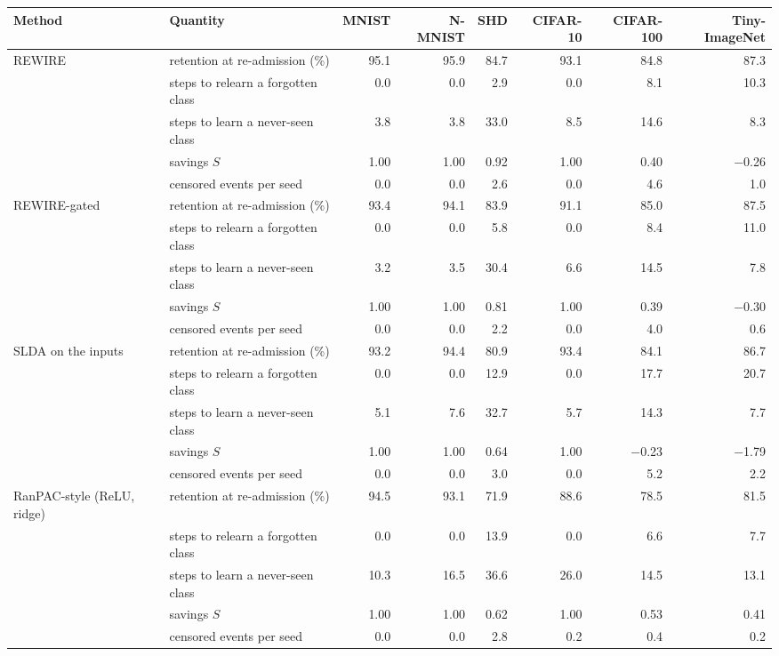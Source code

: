 \begin{tabular*}{\textwidth}{@{\extracolsep{\fill}}lp{3.2cm}rrrrrr@{}}
\toprule
Method & Quantity & MNIST & N-MNIST & SHD & CIFAR-10 & CIFAR-100 & Tiny-ImageNet \\
\midrule
REWIRE & retention at re-admission (\%) & 95.1 & 95.9 & 84.7 & 93.1 & 84.8 & 87.3 \\
 & steps to relearn a forgotten class & 0.0 & 0.0 & 2.9 & 0.0 & 8.1 & 10.3 \\
 & steps to learn a never-seen class & 3.8 & 3.8 & 33.0 & 8.5 & 14.6 & 8.3 \\
 & savings $S$ & 1.00 & 1.00 & 0.92 & 1.00 & 0.40 & \ensuremath{-}0.26 \\
 & censored events per seed & 0.0 & 0.0 & 2.6 & 0.0 & 4.6 & 1.0 \\
REWIRE-gated & retention at re-admission (\%) & 93.4 & 94.1 & 83.9 & 91.1 & 85.0 & 87.5 \\
 & steps to relearn a forgotten class & 0.0 & 0.0 & 5.8 & 0.0 & 8.4 & 11.0 \\
 & steps to learn a never-seen class & 3.2 & 3.5 & 30.4 & 6.6 & 14.5 & 7.8 \\
 & savings $S$ & 1.00 & 1.00 & 0.81 & 1.00 & 0.39 & \ensuremath{-}0.30 \\
 & censored events per seed & 0.0 & 0.0 & 2.2 & 0.0 & 4.0 & 0.6 \\
SLDA on the inputs & retention at re-admission (\%) & 93.2 & 94.4 & 80.9 & 93.4 & 84.1 & 86.7 \\
 & steps to relearn a forgotten class & 0.0 & 0.0 & 12.9 & 0.0 & 17.7 & 20.7 \\
 & steps to learn a never-seen class & 5.1 & 7.6 & 32.7 & 5.7 & 14.3 & 7.7 \\
 & savings $S$ & 1.00 & 1.00 & 0.64 & 1.00 & \ensuremath{-}0.23 & \ensuremath{-}1.79 \\
 & censored events per seed & 0.0 & 0.0 & 3.0 & 0.0 & 5.2 & 2.2 \\
RanPAC-style (ReLU, ridge) & retention at re-admission (\%) & 94.5 & 93.1 & 71.9 & 88.6 & 78.5 & 81.5 \\
 & steps to relearn a forgotten class & 0.0 & 0.0 & 13.9 & 0.0 & 6.6 & 7.7 \\
 & steps to learn a never-seen class & 10.3 & 16.5 & 36.6 & 26.0 & 14.5 & 13.1 \\
 & savings $S$ & 1.00 & 1.00 & 0.62 & 1.00 & 0.53 & 0.41 \\
 & censored events per seed & 0.0 & 0.0 & 2.8 & 0.2 & 0.4 & 0.2 \\

\end{tabular*}
